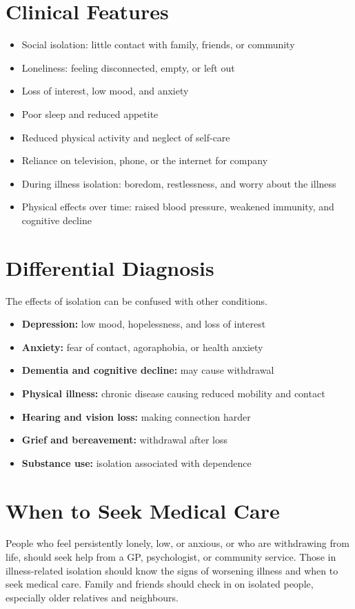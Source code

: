 \section*{Clinical Features}
\begin{itemize}
    \item Social isolation: little contact with family, friends, or community
    \item Loneliness: feeling disconnected, empty, or left out
    \item Loss of interest, low mood, and anxiety
    \item Poor sleep and reduced appetite
    \item Reduced physical activity and neglect of self-care
    \item Reliance on television, phone, or the internet for company
    \item During illness isolation: boredom, restlessness, and worry about the illness
    \item Physical effects over time: raised blood pressure, weakened immunity, and cognitive decline
\end{itemize}

\section*{Differential Diagnosis}
The effects of isolation can be confused with other conditions.
\begin{itemize}
    \item \textbf{Depression:} low mood, hopelessness, and loss of interest
    \item \textbf{Anxiety:} fear of contact, agoraphobia, or health anxiety
    \item \textbf{Dementia and cognitive decline:} may cause withdrawal
    \item \textbf{Physical illness:} chronic disease causing reduced mobility and contact
    \item \textbf{Hearing and vision loss:} making connection harder
    \item \textbf{Grief and bereavement:} withdrawal after loss
    \item \textbf{Substance use:} isolation associated with dependence
\end{itemize}

\section*{When to Seek Medical Care}
People who feel persistently lonely, low, or anxious, or who are withdrawing from life, should seek help from a GP, psychologist, or community service. Those in illness-related isolation should know the signs of worsening illness and when to seek medical care. Family and friends should check in on isolated people, especially older relatives and neighbours.

